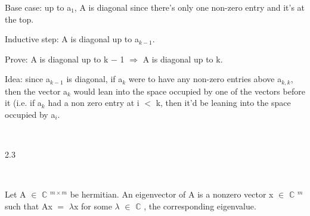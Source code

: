 \documentclass[12pt]{article}
\newcommand{\mt}[1]{\ensuremath{#1}}
\newcommand{\bc}{\mt{\mathbb{C}} }       %
\newcommand{\mem}{\mt{\in} }
\newcommand{\rar}{ \mt{\Rightarrow} }     %
\newcommand{\ms}{\mt{-} }
\newcommand{\ls}{\mt{<} }
\newcommand{\eql}{\mt{=} }
\newcommand{\uw}[2]{#1\mt{_{#2}}}
\newcommand{\uf}[2]{#1\mt{^{#2}}}
\begin{document}
Base case: up to \uw{a}{1}, A is diagonal since there's only one non-zero entry and it's at the top.

Inductive step: A is diagonal up to \uw{a}{k \ms 1}.

Prove: A is diagonal up to k \ms 1 \rar A is diagonal up to k.

Idea: since \uw{a}{k - 1} is diagonal, if \uw{a}{k} were to have any non-zero entries above \uw{a}{k, k}, then the vector \uw{a}{k} would lean into the space occupied by one of the vectors before it (i.e. if \uw{a}{k} had a non zero entry at i \ls k, then it'd be leaning into the space occupied by \uw{a}{i}.

\


2.3

\

Let A \mem \uf{\bc}{m \times m} be hermitian. An eigenvector of A is a nonzero vector x \mem \uf{\bc}{m} such that Ax \eql $\lambda$x for some $\lambda$ \mem \bc, the corresponding eigenvalue.
\end{document}

